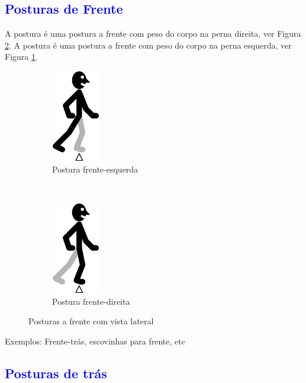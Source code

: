 \subsection{\textcolor{blue}{ Posturas de Frente }}

A postura  é uma postura a frente com peso do corpo na perna direita, ver Figura \ref{fig:frentedireita}.
A postura  é uma postura a frente com peso do corpo na perna esquerda, ver Figura \ref{fig:frenteesquerda}.
\begin{figure}[H]
    \centering
    \begin{subfigure}[b]{0.3\textwidth}
        \includegraphics[height=4cm]{chapters/cap-partituramov-posturas/postura-ft-frente-esq.eps}
        \caption{Postura frente-esquerda}
        \label{fig:frenteesquerda}
    \end{subfigure}
    ~ %
    \begin{subfigure}[b]{0.3\textwidth}
        \includegraphics[height=4cm]{chapters/cap-partituramov-posturas/postura-ft-frente-der.eps}
        \caption{Postura frente-direita}
        \label{fig:frentedireita}
    \end{subfigure}      
    \caption{Posturas a frente  com vista lateral}\label{fig:frentederesq}
\end{figure}

Exemplos: Frente-trás, escovinhas para frente, etc


\subsection{\textcolor{blue}{ Posturas de  trás}}


